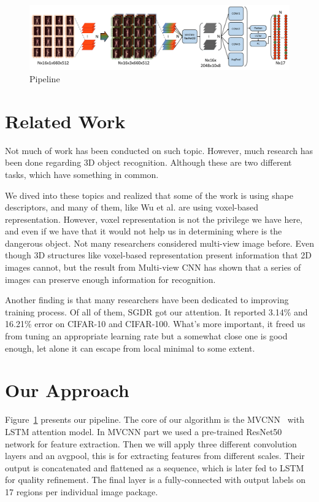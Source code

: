 \documentclass[conference,compsoc]{IEEEtran}
\begin{document}
\begin{figure}[!t]
\includegraphics[width=\textwidth]{../Pic/Network.pdf}
\caption{Pipeline}
\label{network}
\end{figure}
\section{Related Work}
Not much of work has been conducted on such topic. However, much research has been done regarding 3D object recognition. Although these are two different tasks, which have something in common.

We dived into these topics and realized that some of the work is using shape descriptors, and many of them, like Wu et al. \cite{wu20153d} are using voxel-based representation. However, voxel representation is not the privilege we have here, and even if we have that it would not help us in determining where is the dangerous object.
Not many researchers considered multi-view image before. Even though 3D structures like voxel-based representation present information that 2D images cannot, but the result from Multi-view CNN\cite{su15mvcnn}\cite{qi2016volumetric} has shown that a series of images can preserve enough information for recognition.

Another finding is that many researchers have been dedicated to improving training process. Of all of them, SGDR got our attention. It reported 3.14\% and 16.21\% error on CIFAR-10 and CIFAR-100. What's more important, it freed us from tuning an appropriate learning rate but a somewhat close one is good enough, let alone it can escape from local minimal to some extent.


\section{Our Approach}
Figure~\ref{network} presents our pipeline. The core of our algorithm is the MVCNN~\cite{su15mvcnn} with LSTM attention model. In MVCNN part we used a pre-trained ResNet50\cite{he2016deep} network for feature extraction. Then we will apply three different convolution layers and an avgpool, this is for extracting features from different scales. Their output is concatenated and flattened as a sequence, which is later fed to LSTM for quality refinement. The final layer is a fully-connected with output labels on 17 regions per individual image package.
\end{document}
